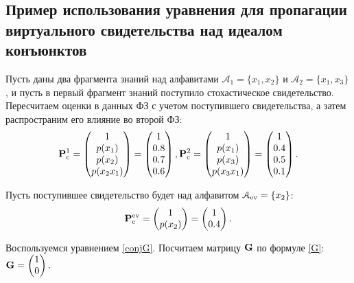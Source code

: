 \subsection*{Пример использования уравнения для пропагации виртуального свидетельства над идеалом конъюнктов}
Пусть даны два фрагмента знаний над алфавитами $\mathcal{A}_1 = \{x_1, x_2\}$ и  $\mathcal{A}_2 = \{x_1, x_3\}$, и пусть в первый фрагмент знаний поступило стохастическое свидетельство. Пересчитаем оценки в данных ФЗ с учетом поступившего свидетельства, а затем распространим его влияние во второй ФЗ:
\begin{equation*}
\mathbf{P}_\mathrm{c}^1 =  \begin{pmatrix}
1 \\ p(x_1) \\ p(x_2) \\ p(x_2x_1)
\end{pmatrix} = \begin{pmatrix}
1 \\ 0.8\\ 0.7\\ 0.6
\end{pmatrix}, 
\mathbf{P}_\mathrm{c}^2 =  \begin{pmatrix}
1 \\ p(x_1) \\ p(x_3) \\ p(x_3x_1)
\end{pmatrix} = \begin{pmatrix}
1 \\ 0.4\\ 0.5\\ 0.1 
\end{pmatrix}.
\end{equation*}

Пусть поступившее свидетельство будет над алфавитом
$\mathcal{A}_{\mathrm{ev}} = \{x_2\}$:
\begin{equation*}
\mathbf{P}_\mathrm{c}^{\mathrm{ev}} = \begin{pmatrix}  1 \\ p(x_2)	\end{pmatrix} = \begin{pmatrix}
1 \\ 0.4
\end{pmatrix}.
\end{equation*}

Воспользуемся уравнением \ref{conjG}. Посчитаем матрицу $\mathbf{G}$ по формуле \ref{G}:
$\mathbf{G} = \begin{pmatrix} 1 \\ 0 \end{pmatrix}.$

